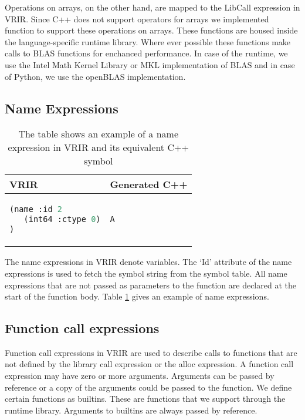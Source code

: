 Operations on arrays, on the other hand, are mapped to the LibCall expression in VRIR. Since C++ does not support operators for arrays we implemented function to support these operations on arrays. These functions are housed inside the language-specific runtime library. Where ever possible these functions make calls to BLAS functions for enchanced performance. In case of the \matlab runtime, we use the Intel Math Kernel Library\cite{mkl} or MKL implementation of BLAS and in case of Python, we use the openBLAS\cite{openblas} implementation.
\subsection{Name Expressions}
\begin{table}[htbp]
\centering
\begin{tabular}{|l|l|}
\hline

VRIR &  Generated C++ \\
\hline
{
\begin{lstlisting}[language=lisp,frame=none, numbers=none]
(name :id 2
   (int64 :ctype 0)
)
\end{lstlisting}
}
&
{
\begin{lstlisting}[language=c,frame=none, numbers=none]
A
\end{lstlisting}
} \\
\hline
\end{tabular}
\caption[Name Expressions example]{The table shows an example of a name expression in VRIR and its equivalent C++ symbol}
\label{tab:nameExpr}
\end{table}
The name expressions in VRIR denote variables. The `Id' attribute of the name expressions is used to fetch the symbol string from the symbol table. All name expressions that are not passed as parameters to the function are declared at the start of the function body. Table \ref{tab:nameExpr} gives an example of name expressions.
\subsection{Function call expressions}
Function call expressions in VRIR are used to describe calls to functions that are not defined by  the library call expression or the alloc expression. A function call expression may have zero or more arguments. Arguments can be passed by reference or a copy of the arguments could be passed to the function. We define certain functions as builtins. These are functions that we support through the runtime library. Arguments to builtins are always passed by reference.
